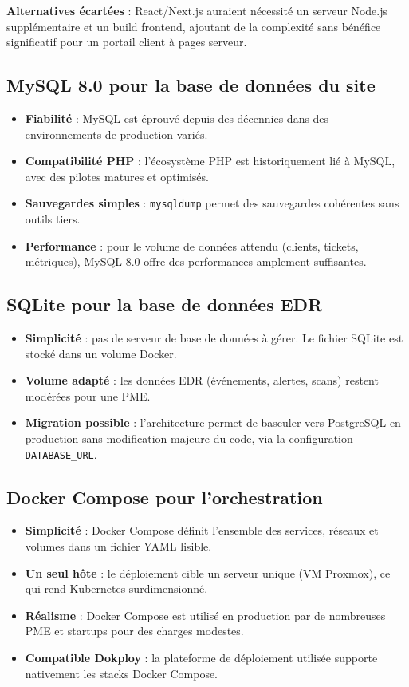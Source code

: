 \textbf{Alternatives écartées} : React/Next.js auraient nécessité un
serveur Node.js supplémentaire et un build frontend, ajoutant de la
complexité sans bénéfice significatif pour un portail client à pages
serveur.

\subsection{MySQL 8.0 pour la base de données du site}

\begin{itemize}
  \item \textbf{Fiabilité} : MySQL est éprouvé depuis des décennies dans
    des environnements de production variés.
  \item \textbf{Compatibilité PHP} : l'écosystème PHP est historiquement
    lié à MySQL, avec des pilotes matures et optimisés.
  \item \textbf{Sauvegardes simples} : \texttt{mysqldump} permet des
    sauvegardes cohérentes sans outils tiers.
  \item \textbf{Performance} : pour le volume de données attendu (clients,
    tickets, métriques), MySQL 8.0 offre des performances amplement
    suffisantes.
\end{itemize}

\subsection{SQLite pour la base de données EDR}

\begin{itemize}
  \item \textbf{Simplicité} : pas de serveur de base de données à gérer.
    Le fichier SQLite est stocké dans un volume Docker.
  \item \textbf{Volume adapté} : les données EDR (événements, alertes,
    scans) restent modérées pour une PME.
  \item \textbf{Migration possible} : l'architecture permet de basculer
    vers PostgreSQL en production sans modification majeure du code,
    via la configuration \texttt{DATABASE\_URL}.
\end{itemize}

\subsection{Docker Compose pour l'orchestration}

\begin{itemize}
  \item \textbf{Simplicité} : Docker Compose définit l'ensemble des
    services, réseaux et volumes dans un fichier YAML lisible.
  \item \textbf{Un seul hôte} : le déploiement cible un serveur unique
    (VM Proxmox), ce qui rend Kubernetes surdimensionné.
  \item \textbf{Réalisme} : Docker Compose est utilisé en production par
    de nombreuses PME et startups pour des charges modestes.
  \item \textbf{Compatible Dokploy} : la plateforme de déploiement
    utilisée supporte nativement les stacks Docker Compose.
\end{itemize}


